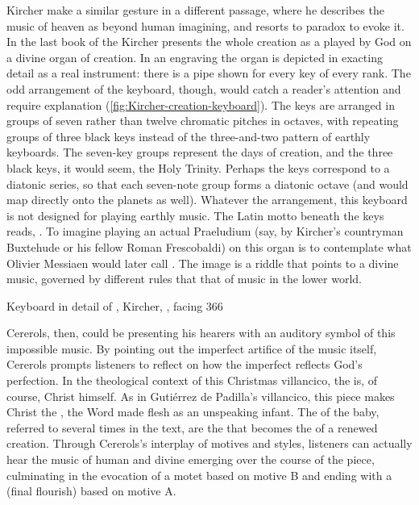 Kircher make a similar gesture in a different passage, where he describes the
music of heaven as beyond human imagining, and resorts to paradox to evoke it.
In the last book of the  Kircher presents the whole creation as
a  played by God on a divine organ of creation.%
    \Autocite[177]{Godwin:KircherTheater}
In an engraving the organ is depicted in exacting detail as a real instrument:
there is a pipe shown for every key of every rank.%
    \Autocite[, facing 366]{Kircher:Musurgia}
The odd arrangement of the keyboard, though, would catch a reader's attention
and require explanation (\cref{fig:Kircher-creation-keyboard}).
The keys are arranged in groups of seven rather than twelve chromatic pitches in
octaves, with repeating groups of three black keys instead of the three-and-two
pattern of earthly keyboards. 
The seven-key groups represent the days of creation, and the three black keys,
it would seem, the Holy Trinity. 
Perhaps the keys correspond to a diatonic series, so that each seven-note group
forms a diatonic octave (and would map directly onto the planets as well).
Whatever the arrangement, this keyboard is not designed for playing earthly
music.
The Latin motto beneath the keys reads, .
To imagine playing an actual Praeludium (say, by Kircher's countryman Buxtehude
or his fellow Roman Frescobaldi) on this organ is to contemplate what Olivier
Messiaen would later call .%
The image is a riddle that points to a divine music, governed by different rules
that that of music in the lower world.

{Keyboard in detail of , Kircher, , facing 366}

Cererols, then, could be presenting his hearers with an auditory symbol of this
impossible music.
By pointing out the imperfect artifice of the music itself, Cererols prompts
listeners to reflect on how the imperfect reflects God's perfection.
In the theological context of this Christmas villancico, the  is, of course, Christ himself.
As in Gutiérrez de Padilla's villancico, this piece makes Christ the
, the Word made flesh as an unspeaking infant.
The  of the baby, referred to several times in the text, are the
 that becomes the  of a renewed creation.
Through Cererols's interplay of motives and styles, listeners can actually hear
the music of human and divine emerging over the course of the piece, culminating
in the evocation of a motet based on motive B and ending with a 
(final flourish) based on motive A.


